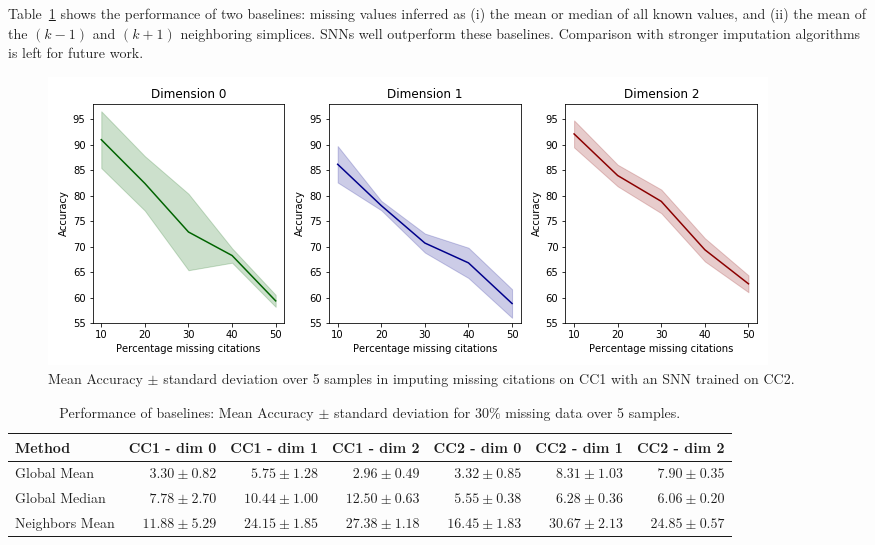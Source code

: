 Table~\ref{table:comparison-SNN} shows the performance of two baselines: missing values inferred as (i) the mean or median of all known values, and (ii) the mean of the $(k-1)$ and $(k+1)$ neighboring simplices.
SNNs well outperform these baselines.
Comparison with stronger imputation algorithms is left for future work.

\begin{figure}[htbp]
  \centering
\includegraphics[scale=0.35]{./figures/accuracy_network1_pretrained.png}
  \caption{Mean Accuracy $\pm$ standard deviation over 5 samples in imputing missing citations on CC1 with an SNN trained on CC2.} \label{fig:transfer-learning}
\end{figure}

\begin{table}[htbp]
  \centering
  \scriptsize{
  \begin{tabular}{lrrrrrr}
    \toprule
    Method   & CC1 - dim 0   & CC1 - dim 1   & CC1 - dim 2   & CC2 - dim 0  & CC2 - dim 1  & CC2 - dim 2 \\
    \midrule
    Global Mean & $3.30 \pm 0.82$ & $5.75\pm 1.28$  &$ 2.96\pm 0.49$  & $3.32 \pm 0.85$ & $8.31 \pm 1.03$  & $7.90\pm 0.35$\\
    Global Median & $7.78 \pm 2.70$   & $10.44 \pm 1.00$ &$ 12.50 \pm 0.63 $ & $5.55 \pm 0.38 $&$ 6.28\pm 0.36  $&$ 6.06\pm 0.20$\\
    Neighbors Mean & $11.88\pm 5.29 $& $24.15 \pm 1.85$ & $27.38 \pm 1.18  $& $16.45 \pm 1.83 $&$ 30.67\pm 2.13$   &$ 24.85 \pm 0.57 $\\
    \bottomrule
  \end{tabular}}
  \vspace{2pt}
  \caption{%
      Performance of baselines: Mean Accuracy $\pm$ standard deviation for $30\%$ missing data over 5 samples.
  }\label{table:comparison-SNN}
\end{table}
